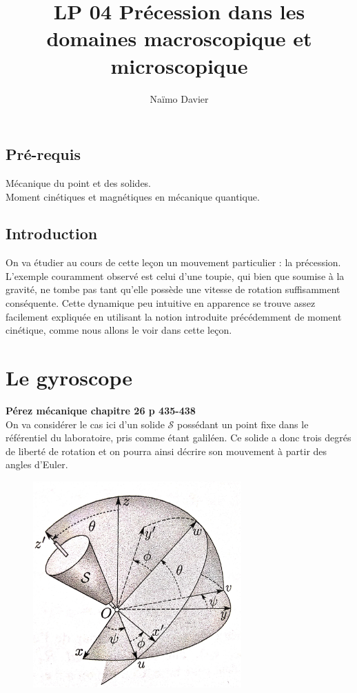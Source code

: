 \documentclass[12pt,prb,aps,epsf]{article}
\begin{document}
	
	\title{LP 04 Précession dans les domaines macroscopique et microscopique}
	\author{Naïmo Davier}
	
	\maketitle
	
	\tableofcontents
	
	\pagebreak
	
	
\subsection{Pré-requis}
Mécanique du point et des solides.\\
Moment cinétiques et magnétiques en mécanique quantique.

\subsection{Introduction}
On va étudier au cours de cette leçon un mouvement particulier : la précession. L'exemple couramment observé est celui d'une toupie, qui bien que soumise à la gravité, ne tombe pas tant qu'elle possède une vitesse de rotation suffisamment conséquente. Cette dynamique peu intuitive en apparence se trouve assez facilement expliquée en utilisant la notion introduite précédemment de moment cinétique, comme nous allons le voir dans cette leçon.

\section{Le gyroscope}
\textbf{Pérez mécanique chapitre 26 p 435-438}\\

On va considérer le cas ici d'un solide $\mathcal{S}$ possédant un point fixe dans le référentiel du laboratoire, pris comme étant galiléen. Ce solide a donc trois degrés de liberté de rotation et on pourra ainsi décrire son mouvement à partir des angles d'Euler.\\

\begin{figure}[h]
	\centerline{\includegraphics[width=8cm]{euler}}
\end{figure}
\end{document}
